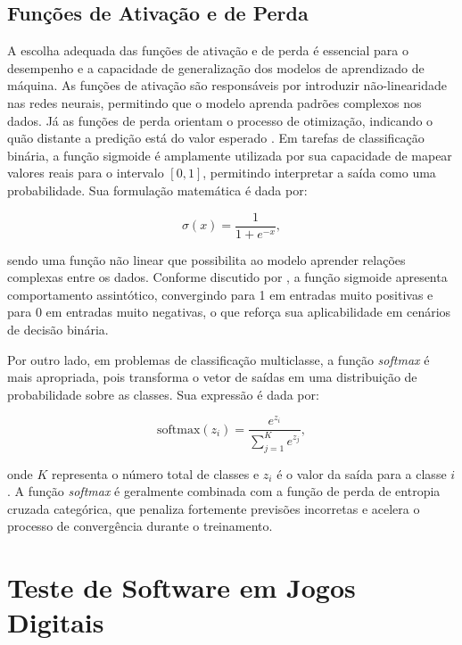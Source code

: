 \subsection{Funções de Ativação e de Perda}

A escolha adequada das funções de ativação e de perda é essencial para o desempenho e a capacidade de generalização dos modelos de aprendizado de máquina. As funções de ativação são responsáveis por introduzir não-linearidade nas redes neurais, permitindo que o modelo aprenda padrões complexos nos dados. Já as funções de perda orientam o processo de otimização, indicando o quão distante a predição está do valor esperado . Em tarefas de classificação binária, a função sigmoide é amplamente utilizada por sua capacidade de mapear valores reais para o intervalo $[0, 1]$, permitindo interpretar a saída como uma probabilidade. Sua formulação matemática é dada por:

\begin{equation}
\sigma(x) = \frac{1}{1 + e^{-x}},
\end{equation}

sendo uma função não linear que possibilita ao modelo aprender relações complexas entre os dados. Conforme discutido por , a função sigmoide apresenta comportamento assintótico, convergindo para 1 em entradas muito positivas e para 0 em entradas muito negativas, o que reforça sua aplicabilidade em cenários de decisão binária.

Por outro lado, em problemas de classificação multiclasse, a função \textit{softmax} é mais apropriada, pois transforma o vetor de saídas em uma distribuição de probabilidade sobre as classes. Sua expressão é dada por:

\begin{equation}
\text{softmax}(z_i) = \frac{e^{z_i}}{\sum_{j=1}^{K} e^{z_j}},
\end{equation}

onde $K$ representa o número total de classes e $z_i$ é o valor da saída para a classe $i$. A função \textit{softmax} é geralmente combinada com a função de perda de entropia cruzada categórica, que penaliza fortemente previsões incorretas e acelera o processo de convergência durante o treinamento.

\section{Teste de Software em Jogos Digitais}

